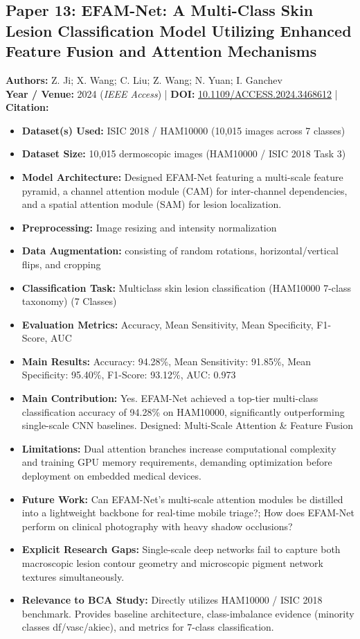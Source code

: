 \documentclass[11pt,a4paper]{article}
\begin{document}
\subsection{Paper 13: EFAM-Net: A Multi-Class Skin Lesion Classification Model Utilizing Enhanced Feature Fusion and Attention Mechanisms}
\textbf{Authors:} Z. Ji; X. Wang; C. Liu; Z. Wang; N. Yuan; I. Ganchev \\
\textbf{Year / Venue:} 2024 (\textit{IEEE Access}) | \textbf{DOI:} \href{https://doi.org/10.1109/ACCESS.2024.3468612}{10.1109/ACCESS.2024.3468612} | \textbf{Citation:} \cite{10695064}

\begin{itemize}\small
\item \textbf{Dataset(s) Used:} ISIC 2018 / HAM10000 (10,015 images across 7 classes)
\item \textbf{Dataset Size:} 10,015 dermoscopic images (HAM10000 / ISIC 2018 Task 3)
\item \textbf{Model Architecture:} Designed EFAM-Net featuring a multi-scale feature pyramid, a channel attention module (CAM) for inter-channel dependencies, and a spatial attention module (SAM) for lesion localization.
\item \textbf{Preprocessing:} Image resizing and intensity normalization
\item \textbf{Data Augmentation:} consisting of random rotations, horizontal/vertical flips, and cropping
\item \textbf{Classification Task:} Multiclass skin lesion classification (HAM10000 7-class taxonomy) (7 Classes)
\item \textbf{Evaluation Metrics:} Accuracy, Mean Sensitivity, Mean Specificity, F1-Score, AUC
\item \textbf{Main Results:} Accuracy: 94.28\%, Mean Sensitivity: 91.85\%, Mean Specificity: 95.40\%, F1-Score: 93.12\%, AUC: 0.973
\item \textbf{Main Contribution:} Yes. EFAM-Net achieved a top-tier multi-class classification accuracy of 94.28\% on HAM10000, significantly outperforming single-scale CNN baselines. Designed: Multi-Scale Attention \& Feature Fusion
\item \textbf{Limitations:} Dual attention branches increase computational complexity and training GPU memory requirements, demanding optimization before deployment on embedded medical devices.
\item \textbf{Future Work:} Can EFAM-Net's multi-scale attention modules be distilled into a lightweight backbone for real-time mobile triage?; How does EFAM-Net perform on clinical photography with heavy shadow occlusions?
\item \textbf{Explicit Research Gaps:} Single-scale deep networks fail to capture both macroscopic lesion contour geometry and microscopic pigment network textures simultaneously.
\item \textbf{Relevance to BCA Study:} Directly utilizes HAM10000 / ISIC 2018 benchmark. Provides baseline architecture, class-imbalance evidence (minority classes df/vasc/akiec), and metrics for 7-class classification.
\end{itemize}
\end{document}
